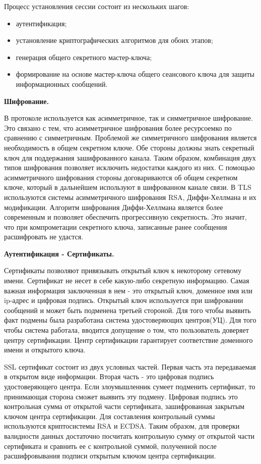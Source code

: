 Процесс установления сессии состоит из нескольких шагов:
\begin{itemize}
	\item аутентификация;
	\item установление криптографических алгоритмов для обоих этапов;
	\item генерация общего секретного мастер-ключа;
	\item формирование на основе мастер-ключа общего сеансового ключа для защиты информационных сообщений.
\end{itemize}

\textbf{Шифрование.}

В протоколе используется как асимметричное, так и симметричное шифрование. Это связано с тем, что асимметричное шифрования более ресурсоемко по сравнению с симметричным. Проблемой же симметричного шифрования является необходимость в общем секретном ключе. Обе стороны должны знать секретный ключ для поддержания зашифрованного канала. Таким образом, комбинация двух типов шифрования позволяет исключить недостатки каждого из них. С помощью асимметричного шифрования стороны договариваются об общем секретном ключе, который в дальнейшем используют в шифрованном канале связи. В TLS используются системы асимметричного шифрования RSA, Диффи-Хеллмана и их модификации. Алгоритм шифрования Диффи-Хеллмана является более современным и позволяет обеспечить прогрессивную секретность. Это значит, что при компрометации секретного ключа, записанные ранее сообщения расшифровать не удастся.

\textbf{Аутентификация - Сертификаты.}

Сертификаты позволяют привязывать открытый ключ к некоторому сетевому имени. Сертификат не несет в себе какую-либо секретную информацию. Самая важная информация заключенная в нем - это открытый ключ, доменное имя или ip-адрес и цифровая подпись. Открытый ключ используется при шифровании сообщений и может быть подменена третьей стороной. Для того чтобы выявить факт подмены была разработана система удостоверяющих центров(УЦ). Для того чтобы система работала, вводится допущение о том, что пользователь доверяет центру сертификации. Центр сертификации гарантирует соответствие доменного имени и открытого ключа.

SSL сертификат состоит из двух условных частей. Первая часть эта передаваемая в открытом виде информации. Вторая часть - это цифровая подпись удостоверяющего центра. Если злоумышленник сумеет подменить сертификат, то принимающая сторона сможет выявить эту подмену. Цифровая подпись это контрольная сумма от открытой части сертификата, зашифрованная закрытым ключом центра сертификации. Для составления контрольный суммы используются криптосистемы RSA и ECDSA. Таким образом, для проверки валидности данных достаточно посчитать контрольную сумму от открытой части сертификата и сравнить ее с контрольной суммой, полученной после расшифровывания подписи открытым ключом центра сертификации.

